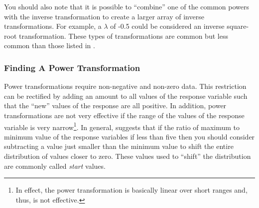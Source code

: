 \documentclass[10pt,openany]{book}\usepackage[]{graphicx}\usepackage[]{color}
\begin{document}
You should also note that it is possible to ``combine'' one of the common powers with the inverse transformation to create a larger array of inverse transformations.  For example, a $\lambda$ of -0.5 could be considered an inverse square-root transformation.  These types of transformations are common but less common than those listed in .

\subsubsection{Finding A Power Transformation}
Power transformations require non-negative and non-zero data.  This restriction can be rectified by adding an amount to all values of the response variable such that the ``new'' values of the response are all positive.  In addition, power transformations are not very effective if the range of the values of the response variable is very narrow\footnote{In effect, the power transformation is basically linear over short ranges and, thus, is not effective.}.  In general, \cite{Fox1997} suggests that if the ratio of maximum to minimum value of the response variables if less than five then you should consider subtracting a value just smaller than the minimum value to shift the entire distribution of values closer to zero.  These values used to ``shift'' the distribution are commonly called \emph{start} values.


\vspace{-10pt}
\end{document}
